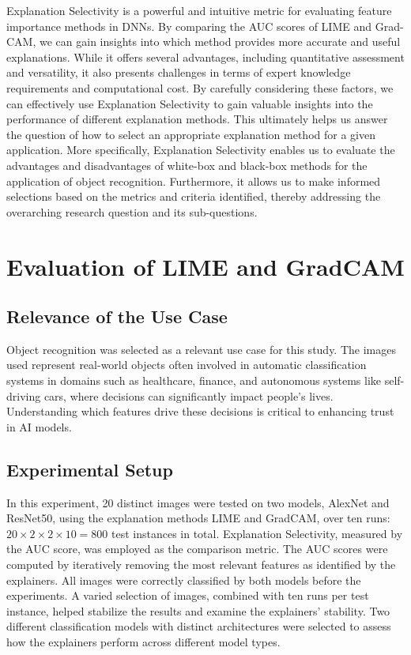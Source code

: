 \documentclass{article}
\begin{document}
Explanation Selectivity is a powerful and intuitive metric for evaluating feature importance methods in DNNs. By comparing the AUC scores of LIME and Grad-CAM, we can gain insights into which method provides more accurate and useful explanations. While it offers several advantages, including quantitative assessment and versatility, it also presents challenges in terms of expert knowledge requirements and computational cost. By carefully considering these factors, we can effectively use Explanation Selectivity to gain valuable insights into the performance of different explanation methods. This ultimately helps us answer the question of how to select an appropriate explanation method for a given application. More specifically, Explanation Selectivity enables us to evaluate the advantages and disadvantages of white-box and black-box methods for the application of object recognition. Furthermore, it allows us to make informed selections based on the metrics and criteria identified, thereby addressing the overarching research question and its sub-questions.

\section{Evaluation of LIME and GradCAM}
\subsection{Relevance of the Use Case}
Object recognition was selected as a relevant use case for this study. The images used represent real-world objects often involved in automatic classification systems in domains such as healthcare, finance, and autonomous systems like self-driving cars, where decisions can significantly impact people’s lives. Understanding which features drive these decisions is critical to enhancing trust in AI models.

\subsection{Experimental Setup}
In this experiment, 20 distinct images were tested on two models, AlexNet and ResNet50, using the explanation methods LIME and GradCAM, over ten runs: $20 \times 2 \times 2 \times 10 = 800$ test instances in total. Explanation Selectivity, measured by the AUC score, was employed as the comparison metric. The AUC scores were computed by iteratively removing the most relevant features as identified by the explainers.
All images were correctly classified by both models before the experiments. A varied selection of images, combined with ten runs per test instance, helped stabilize the results and examine the explainers’ stability. Two different classification models with distinct architectures were selected to assess how the explainers perform across different model types.
\end{document}
